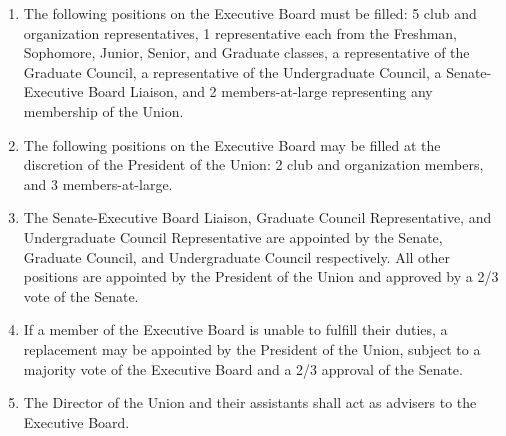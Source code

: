 \begin{enumerate}
\item The following positions on the Executive Board must be filled: 5 club and organization representatives, 1 representative each from the Freshman, Sophomore, Junior, Senior, and Graduate classes, a representative of the Graduate Council, a representative of the Undergraduate Council, a Senate-Executive Board Liaison, and 2 members-at-large representing any membership of the Union.
\item The following positions on the Executive Board may be filled at the discretion of the President of the Union: 2 club and organization members, and 3 members-at-large.
\item The Senate-Executive Board Liaison, Graduate Council Representative, and Undergraduate Council Representative are appointed by the Senate, Graduate Council, and Undergraduate Council respectively. All other positions are appointed by the President of the Union and approved by a 2/3 vote of the Senate.
\item If a member of the Executive Board is unable to fulfill their duties, a replacement may be appointed by the President of the Union, subject to a majority vote of the Executive Board and a 2/3 approval of the Senate.
\item The Director of the Union and their assistants shall act as advisers to the Executive Board.
\end{enumerate}





